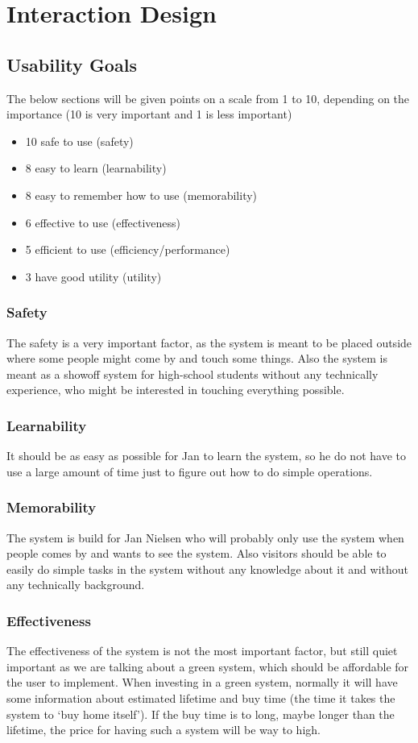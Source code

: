 \section{Interaction Design}
\subsection{Usability Goals}
The below sections will be given points on a scale from 1 to 10, depending on
the importance (10 is very important and 1 is less important)
\begin{itemize}
	\item 10 safe to use (safety)
	\item 8 easy to learn (learnability) 
	\item 8 easy to remember how to use (memorability)
	\item 6 effective to use (effectiveness) 
	\item 5 efficient to use (efficiency/performance)
	\item 3 have good utility (utility)	
\end{itemize}
\subsubsection{Safety}
The safety is a very important factor, as the system is meant to be placed
outside where some people might come by and touch some things. Also the
system is meant as a showoff system for high-school students without any 
technically experience, who might be interested in touching everything possible.
\subsubsection{Learnability}
It should be as easy as possible for Jan to learn the system, so he do not have
to use a large amount of time just to figure out how to do simple operations.
\subsubsection{Memorability}
The system is build for Jan Nielsen who will probably only use the system when
people comes by and wants to see the system. Also visitors should be able to
easily do simple tasks in the system without any knowledge about it and without
any technically background.
\subsubsection{Effectiveness}
The effectiveness of the system is not the most important factor, but
still quiet important as we are talking about a green system, which should be
affordable for the user to implement. When investing in a green system, normally
it will have some information about estimated lifetime and buy time (the time
it takes the system to `buy home itself'). If the buy time is to long, maybe
longer than the lifetime, the price for having such a system will be way to
high.
